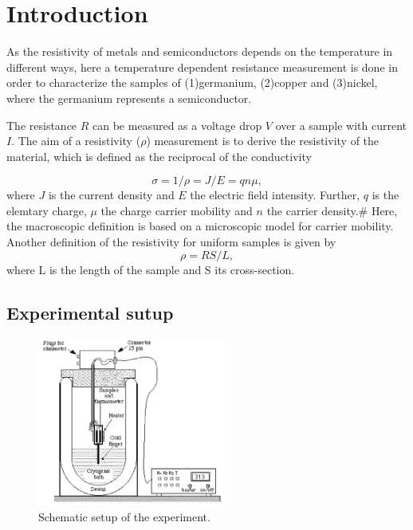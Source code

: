 



\section{Introduction}
\label{sec:Introduction}

As the resistivity of metals and semiconductors depends on the temperature in different ways,
here a temperature dependent resistance measurement is done in order to characterize the samples of 
(1)germanium, (2)copper and (3)nickel, where the germanium represents a semiconductor.

The resistance $R$ can be measured as a voltage drop $V$ over a sample with current $I$.
The aim of a resistivity ($\rho$) measurement is to derive the resistivity of the material, which is defined as the reciprocal of the conductivity

\begin{equation}
    \sigma = 1 / \rho = J / E = q n \mu,
\end{equation}
where $J$ is the current density and $E$ the electric field intensity.
Further, $q$ is the elemtary charge, $\mu$ the charge carrier mobility and $n$ the carrier density.#
Here, the macroscopic definition is based on a microscopic model for carrier mobility.
Another definition of the resistivity for uniform samples is given by 
\begin{equation}
    \rho = R S / L,
\end{equation}
where L is the length of the sample and S its cross-section.

\subsection{Experimental sutup}
\label{sec:setup}

\begin{figure}
  \centering
  \includegraphics[width=0.55\textwidth]{graphics/setup.png}
  \caption[width=0.4\textwidth]{Schematic setup of the experiment\cite{instruction}.}
  \label{fig:setup}
\end{figure}

